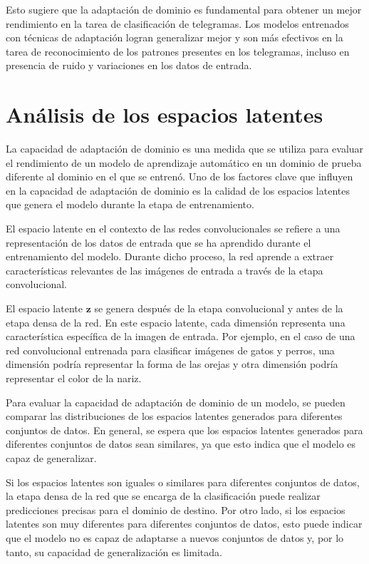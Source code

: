 Esto sugiere que la adaptación de dominio es fundamental para obtener un mejor rendimiento en la tarea de clasificación
de telegramas. Los modelos entrenados con técnicas de adaptación logran generalizar mejor y son más efectivos en la
tarea de reconocimiento de los patrones presentes en los telegramas, incluso en presencia de ruido y variaciones en los
datos de entrada.

\section{Análisis de los espacios latentes}

La capacidad de adaptación de dominio es una medida que se utiliza para evaluar el rendimiento de un modelo de
aprendizaje automático en un dominio de prueba diferente al dominio en el que se entrenó. Uno de los factores clave que
influyen en la capacidad de adaptación de dominio es la calidad de los espacios latentes que genera el modelo durante
la etapa de entrenamiento.

El espacio latente en el contexto de las redes convolucionales se refiere a una representación de los datos de entrada
que se ha aprendido durante el entrenamiento del modelo. Durante dicho proceso, la red aprende a extraer
características relevantes de las imágenes de entrada a través de la etapa convolucional.

El espacio latente $\mathbf{z}$ se genera después de la etapa convolucional y antes de la etapa densa de la red. En
este espacio latente, cada dimensión representa una característica específica de la imagen de entrada. Por ejemplo, en
el caso de una red convolucional entrenada para clasificar imágenes de gatos y perros, una dimensión podría representar
la forma de las orejas y otra dimensión podría representar el color de la nariz.

Para evaluar la capacidad de adaptación de dominio de un modelo, se pueden comparar las distribuciones de los espacios
latentes generados para diferentes conjuntos de datos. En general, se espera que los espacios latentes generados para
diferentes conjuntos de datos sean similares, ya que esto indica que el modelo es capaz de generalizar.

Si los espacios latentes son iguales o similares para diferentes conjuntos de datos, la etapa densa de la red que se
encarga de la clasificación puede realizar predicciones precisas para el dominio de destino. Por otro lado, si los
espacios latentes son muy diferentes para diferentes conjuntos de datos, esto puede indicar que el modelo no es capaz
de adaptarse a nuevos conjuntos de datos y, por lo tanto, su capacidad de generalización es limitada.

